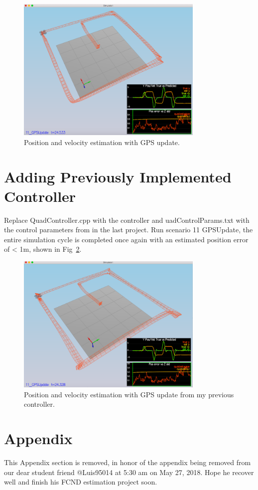 \documentclass[letterpaper]{article}
\begin{document}
\begin{figure}[ht]
\centering
\includegraphics[width=0.8\textwidth]{./images/scenario11.png}
\caption{\label{fig:GPS_update} Position and velocity estimation with GPS update.}
\end{figure}

\section{Adding Previously Implemented Controller}

Replace QuadController.cpp with the controller and uadControlParams.txt with the control parameters from in the last project. Run scenario 11 GPSUpdate, the entire simulation cycle is completed once again with an estimated position error of < 1m, shown in Fig~\ref{fig:GPS_update2}.

\begin{figure}[ht]
\centering
\includegraphics[width=0.8\textwidth]{./images/scenario11_2.png}
\caption{\label{fig:GPS_update2} Position and velocity estimation with GPS update from my previous controller.}
\end{figure}

\clearpage

\section*{Appendix}
This Appendix section is removed, in honor of the appendix being removed from our dear student friend @Luis95014 at 5:30 am on May 27, 2018. Hope he recover well and finish his FCND estimation project soon.
\end{document}
